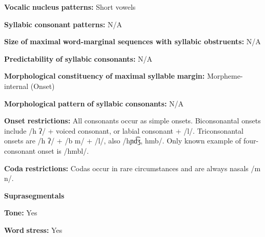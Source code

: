 \begin{styleBody}
\textbf{Vocalic} \textbf{nucleus} \textbf{patterns:} Short vowels
\end{styleBody}

\begin{styleBody}
\textbf{Syllabic} \textbf{consonant} \textbf{patterns:} N/A
\end{styleBody}

\begin{styleBody}
\textbf{Size} \textbf{of} \textbf{maximal} \textbf{word{}-marginal sequences with syllabic obstruents:} N/A
\end{styleBody}

\begin{styleBody}
\textbf{Predictability} \textbf{of} \textbf{syllabic} \textbf{consonants:} N/A
\end{styleBody}

\begin{styleBody}
\textbf{Morphological} \textbf{constituency} \textbf{of} \textbf{maximal} \textbf{syllable} \textbf{margin:} Morpheme-internal (Onset)
\end{styleBody}

\begin{styleBody}
\textbf{Morphological} \textbf{pattern} \textbf{of} \textbf{syllabic} \textbf{consonants:} N/A
\end{styleBody}

\begin{styleBody}
\textbf{Onset} \textbf{restrictions:} All consonants occur as simple onsets. Biconsonantal onsets include /h ʔ/ + voiced consonant, or labial consonant + /l/. Triconsonantal onsets are /h ʔ/ + /b m/ + /l/, also /hɲd͡ʒ, hmb/. Only known example of four-consonant onset is /hmbl/.
\end{styleBody}

\begin{styleBody}
\textbf{Coda} \textbf{restrictions:} Codas occur in rare circumstances and are always nasals /m n/.
\end{styleBody}

\begin{styleBody}
\textbf{Suprasegmentals}
\end{styleBody}

\begin{styleBody}
\textbf{Tone:} Yes
\end{styleBody}

\begin{styleBody}
\textbf{Word} \textbf{stress:} Yes
\end{styleBody}

